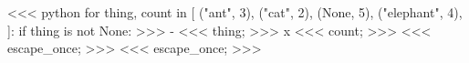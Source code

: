 <<< python
for thing, count in [
    ("ant", 3),
    ("cat", 2),
    (None, 5),
    ("elephant", 4),
]:
    if thing is not None:
>>>
- <<< thing; >>> x <<< count; >>>
<<< escape_once; >>>
<<< escape_once; >>>
